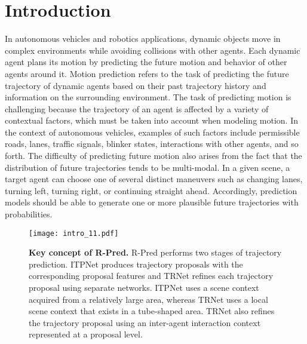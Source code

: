 \documentclass[10pt,twocolumn,letterpaper]{article}
\begin{document}
\section{Introduction}
\label{sec:intro}
In autonomous vehicles and robotics applications, dynamic objects move in complex environments while avoiding collisions with other agents. Each dynamic agent plans its motion by predicting the future motion and behavior of other agents around it.  Motion prediction refers to the task of predicting the future trajectory of  dynamic agents based on their past trajectory history and information on the surrounding environment.
The task of predicting motion is challenging because the trajectory of an agent is affected by a variety of contextual factors, which must be taken into account when modeling motion.
In the context of autonomous vehicles, examples of such factors include permissible roads, lanes, traffic signals, blinker states, interactions with other agents, and so forth. The difficulty of predicting future motion also arises from the fact that the distribution of future trajectories tends to be multi-modal.   In a given scene, a target agent can choose one of several distinct maneuvers such as changing lanes, turning left, turning right, or continuing straight ahead. Accordingly, prediction models should be able to generate one or more plausible future trajectories with probabilities.

\begin{figure}[t]
\centering  
\texttt{[image: intro\_11.pdf]}
\caption{\textbf{Key concept of R-Pred.} R-Pred performs two stages of trajectory prediction. ITPNet produces  trajectory proposals with the corresponding proposal features and TRNet refines each trajectory proposal using separate networks. ITPNet uses a scene context acquired from a relatively large area, whereas TRNet uses a local scene context that exists in a tube-shaped area.  TRNet also refines the trajectory proposal  using an inter-agent interaction context represented at a proposal level.}
\label{intro}  
\end{figure}
\end{document}
